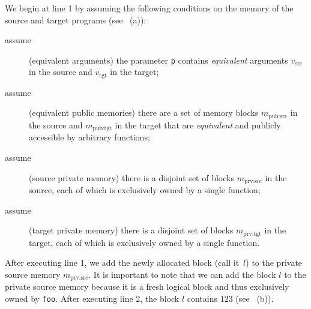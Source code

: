 We begin at line 1 by assuming the
following conditions on the memory of the source and target programs (see ~(a)):
\begin{description}
\item[assume] (equivalent arguments) the parameter \texttt{p} contains
  \emph{equivalent} arguments $v_\textrm{src} $ in the source and $v_\textrm{tgt}$ in the target;
\item[assume] (equivalent public memories) 
  there are a set of memory blocks
  $m_\textrm{pub:src}$ in the source and
  $m_\textrm{pub:tgt}$ in the target that are
  \emph{equivalent} and publicly accessible by arbitrary functions;
\item[assume] (source private memory) 
  there is a disjoint set of blocks
  $m_\textrm{prv:src}$ in the source, each of which is
  exclusively owned by a single function;
\item[assume] (target private memory) 
  there is a disjoint set of blocks
  $m_\textrm{prv:tgt}$ in the target, each of which is
  exclusively owned by a single function.
\end{description}
After executing line 1, we add the newly allocated block (call it~$l$) to
the private source memory $m_\textrm{prv:src}$. It is important to note that we can add the
block $l$ to the private source memory because it is a fresh logical
block and thus exclusively owned by \texttt{foo}.  After executing
line 2, the block $l$ contains $123$ (see ~(b)).

